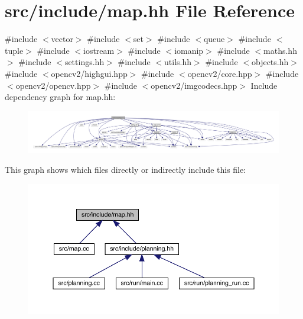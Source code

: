 \hypertarget{map_8hh}{}\section{src/include/map.hh File Reference}
\label{map_8hh}
{\ttfamily \#include $<$vector$>$}\newline
{\ttfamily \#include $<$set$>$}\newline
{\ttfamily \#include $<$queue$>$}\newline
{\ttfamily \#include $<$tuple$>$}\newline
{\ttfamily \#include $<$iostream$>$}\newline
{\ttfamily \#include $<$iomanip$>$}\newline
{\ttfamily \#include $<$maths.\+hh$>$}\newline
{\ttfamily \#include $<$settings.\+hh$>$}\newline
{\ttfamily \#include $<$utils.\+hh$>$}\newline
{\ttfamily \#include $<$objects.\+hh$>$}\newline
{\ttfamily \#include $<$opencv2/highgui.\+hpp$>$}\newline
{\ttfamily \#include $<$opencv2/core.\+hpp$>$}\newline
{\ttfamily \#include $<$opencv2/opencv.\+hpp$>$}\newline
{\ttfamily \#include $<$opencv2/imgcodecs.\+hpp$>$}\newline
Include dependency graph for map.\+hh\+:
\nopagebreak
\begin{figure}[H]
\begin{center}
\leavevmode
\includegraphics[width=350pt]{map_8hh__incl}
\end{center}
\end{figure}
This graph shows which files directly or indirectly include this file\+:
\nopagebreak
\begin{figure}[H]
\begin{center}
\leavevmode
\includegraphics[width=350pt]{map_8hh__dep__incl}
\end{center}
\end{figure}
